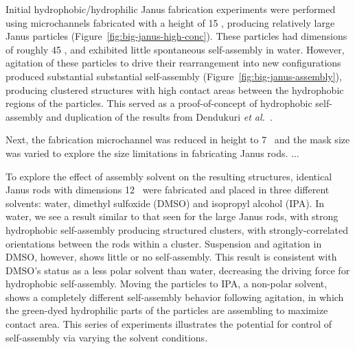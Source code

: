 Initial hydrophobic/hydrophilic Janus fabrication experiments 
were performed using microchannels fabricated with a height of 15 \microns, 
producing relatively large Janus particles (Figure~\ref{fig:big-janus-high-conc}). These particles had dimensions 
of roughly 45   \microns, and exhibited little spontaneous self-assembly in water.  However, agitation
of these particles to drive their rearrangement into new configurations produced substantial substantial
self-assembly (Figure~\ref{fig:big-janus-assembly}), producing clustered structures with high contact
areas between the hydrophobic regions of the particles.  This served as a proof-of-concept of 
hydrophobic self-assembly and duplication of the
results from Dendukuri \textit{et al.}~\cite{dendukuri-amph}.  


Next, the fabrication microchannel was reduced in height to 7 \microns~and the mask size was varied to explore the
size limitations in fabricating Janus rods.  ...


To explore the effect of assembly solvent on the resulting structures, identical Janus rods with dimensions 
12   \microns~were fabricated and placed in three different solvents: water, dimethyl sulfoxide 
(DMSO) and isopropyl alcohol (IPA).  In water, we see a result similar to that seen for the large Janus rods,
with strong hydrophobic self-assembly producing structured clusters, with strongly-correlated orientations
between the rods within a cluster.  Suspension and agitation in DMSO, however, shows little or no self-assembly.
This result is consistent with DMSO's status as a less polar solvent than water, decreasing the driving force
for hydrophobic self-assembly.  Moving the particles to IPA, a non-polar solvent, shows a completely different
self-assembly behavior following agitation, in which the green-dyed hydrophilic parts of the particles are 
assembling to maximize contact area.  This series of experiments illustrates the potential for 
control of self-assembly via varying the solvent conditions.


